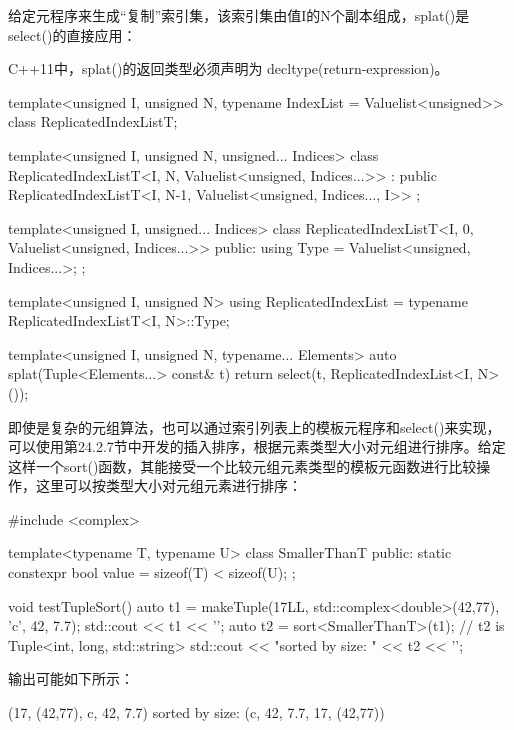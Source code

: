 给定元程序来生成“复制”索引集，该索引集由值I的N个副本组成，splat()是select()的直接应用：

\begin{notice}
C++11中，splat()的返回类型必须声明为 \inlcpp{->}decltype(return-expression)。
\end{notice}

\begin{cpp}
template<unsigned I, unsigned N, typename IndexList = Valuelist<unsigned>>
class ReplicatedIndexListT;

template<unsigned I, unsigned N, unsigned... Indices>
class ReplicatedIndexListT<I, N, Valuelist<unsigned, Indices...>>
: public ReplicatedIndexListT<I, N-1,
								Valuelist<unsigned, Indices..., I>> {};

template<unsigned I, unsigned... Indices>
class ReplicatedIndexListT<I, 0, Valuelist<unsigned, Indices...>> {
	public:
	using Type = Valuelist<unsigned, Indices...>;
};

template<unsigned I, unsigned N>
using ReplicatedIndexList = typename ReplicatedIndexListT<I, N>::Type;

template<unsigned I, unsigned N, typename... Elements>
auto splat(Tuple<Elements...> const& t) {
	return select(t, ReplicatedIndexList<I, N>());
}
\end{cpp}

即使是复杂的元组算法，也可以通过索引列表上的模板元程序和select()来实现，可以使用第24.2.7节中开发的插入排序，根据元素类型大小对元组进行排序。给定这样一个sort()函数，其能接受一个比较元组元素类型的模板元函数进行比较操作，这里可以按类型大小对元组元素进行排序：

\begin{cpp}
#include <complex>

template<typename T, typename U>
class SmallerThanT {
	public:
	static constexpr bool value = sizeof(T) < sizeof(U);
};

void testTupleSort() {
	auto t1 = makeTuple(17LL, std::complex<double>(42,77), 'c', 42, 7.7);
	std::cout << t1 << '\n';
	auto t2 = sort<SmallerThanT>(t1); // t2 is Tuple<int, long, std::string>
	std::cout << "sorted by size: " << t2 << '\n';
}
\end{cpp}

输出可能如下所示：

\begin{cpp}
(17, (42,77), c, 42, 7.7)
sorted by size: (c, 42, 7.7, 17, (42,77))
\end{cpp}

